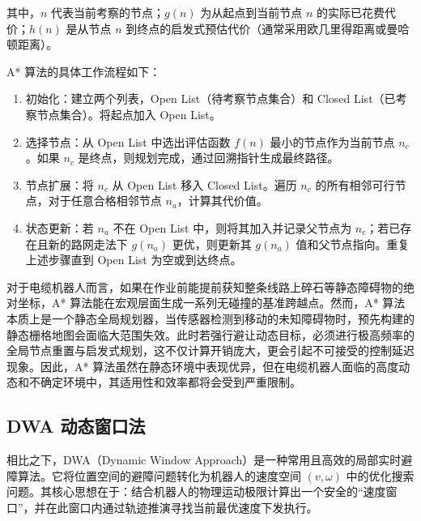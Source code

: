 其中，$n$ 代表当前考察的节点；$g(n)$ 为从起点到当前节点 $n$ 的实际已花费代价；$h(n)$ 是从节点 $n$ 到终点的启发式预估代价（通常采用欧几里得距离或曼哈顿距离）。

A* 算法的具体工作流程如下：
\begin{enumerate}
    \item 初始化：建立两个列表，Open List（待考察节点集合）和 Closed List（已考察节点集合）。将起点加入 Open List。
    \item 选择节点：从 Open List 中选出评估函数 $f(n)$ 最小的节点作为当前节点 $n_c$。如果 $n_c$ 是终点，则规划完成，通过回溯指针生成最终路径。
    \item 节点扩展：将 $n_c$ 从 Open List 移入 Closed List。遍历 $n_c$ 的所有相邻可行节点，对于任意合格相邻节点 $n_a$，计算其代价值。
    \item 状态更新：若 $n_a$ 不在 Open List 中，则将其加入并记录父节点为 $n_c$；若已存在且新的路网走法下 $g(n_a)$ 更优，则更新其 $g(n_a)$ 值和父节点指向。重复上述步骤直到 Open List 为空或到达终点。
\end{enumerate}

对于电缆机器人而言，如果在作业前能提前获知整条线路上碎石等静态障碍物的绝对坐标，A* 算法能在宏观层面生成一系列无碰撞的基准跨越点。然而，A* 算法本质上是一个静态全局规划器，当传感器检测到移动的未知障碍物时，预先构建的静态栅格地图会面临大范围失效。此时若强行避让动态目标，必须进行极高频率的全局节点重置与启发式规划，这不仅计算开销庞大，更会引起不可接受的控制延迟现象。因此，A* 算法虽然在静态环境中表现优异，但在电缆机器人面临的高度动态和不确定环境中，其适用性和效率都将会受到严重限制。

\subsection{DWA 动态窗口法}
相比之下，DWA（Dynamic Window Approach）是一种常用且高效的局部实时避障算法。它将位置空间的避障问题转化为机器人的速度空间 $(v, \omega)$ 中的优化搜索问题。其核心思想在于：结合机器人的物理运动极限计算出一个安全的“速度窗口”，并在此窗口内通过轨迹推演寻找当前最优速度下发执行\cite{JTGZ20260403002}。

